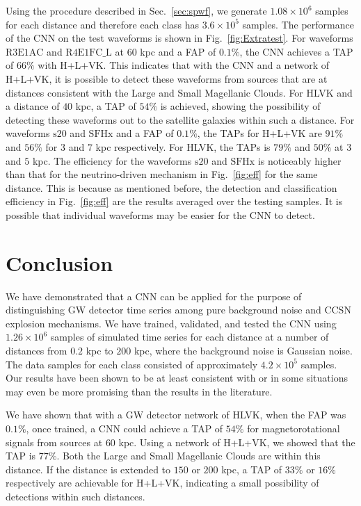 \documentclass[aps,twocolumn,showpacs,groupedaddress, nofootinbib]{revtex4}  %
\begin{document}
%
%
Using the procedure described in Sec.~\ref{sec:spwf}, we generate $1.08\times10^6$
samples for each distance and therefore each class has $3.6\times10^5$
samples. The performance of the \ac{CNN} on the test waveforms is shown in
Fig.~\ref{fig:Extratest}. For waveforms $\text{R3E1AC}$ and $\text{R4E1FC\_L}$
at $60$ kpc and a \ac{FAP} of $0.1\%$, the \ac{CNN} achieves a \ac{TAP} of $66\%$
with H+L+VK. This indicates that with the
\ac{CNN} and a network of H+L+VK, it is possible to detect these waveforms from sources that are at
distances consistent with the Large and Small Magellanic Clouds.
For HLVK and a distance of $40$ kpc, a \ac{TAP} of $54\%$ is achieved, showing the possibility of detecting 
these waveforms out to the satellite galaxies within such a distance.
For waveforms $\text{s}20$ and $\text{SFHx}$ and a \ac{FAP} of $0.1\%$, 
the \acp{TAP} for H+L+VK are $91\%$ and $56\%$ for $3$ and $7$ kpc respectively.
For HLVK, the \acp{TAP} is $79\%$ and $50\%$ at $3$ and $5$ kpc.
The efficiency for the waveforms $\text{s}20$ and $\text{SFHx}$ is noticeably
higher than that for the neutrino-driven mechanism in Fig.~\ref{fig:eff} for
the same distance. This is because as mentioned before, the detection and
classification efficiency in Fig.~\ref{fig:eff} are the results averaged over
the testing samples. It is possible that individual waveforms may be easier for
the \ac{CNN} to detect. 
\section{Conclusion}\label{sec:conclusion}
%
%
We have demonstrated that a \ac{CNN} can be applied for the purpose of
distinguishing \ac{GW} detector time series among pure background noise and
\ac{CCSN} explosion mechanisms. We have trained, validated, and tested 
the \ac{CNN} using $1.26\times10^{6}$ samples of simulated time series for each distance at a
number of distances from $0.2$ kpc to $200$ kpc, where the background noise is Gaussian noise. 
The data samples for each class consisted of approximately $4.2\times10^5$ samples. 
Our results have been shown to be at least consistent with or in some situations may even be 
more promising than the results in the literature.
%
%

We have shown that with a \ac{GW} detector network of HLVK, when the \ac{FAP}
was $0.1\%$, once trained, a \ac{CNN} could achieve a \ac{TAP} of $54\%$
for magnetorotational signals from sources at $60$ kpc. Using a network of
H+L+VK, we showed that the \ac{TAP} is $77\%$.  Both the Large and
Small Magellanic Clouds are within this distance. If the distance is extended
to $150$ or $200$ kpc, a \ac{TAP} of $33\%$ or $16\%$ respectively are
achievable for H+L+VK, indicating a small possibility of detections within
such distances. 
%
%
\end{document}
